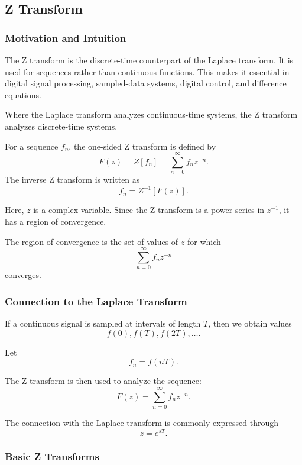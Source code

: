 \subsection{Z Transform}

\subsubsection*{Motivation and Intuition}

The Z transform is the discrete-time counterpart of the Laplace transform. It is used for sequences rather than continuous functions. This makes it essential in digital signal processing, sampled-data systems, digital control, and difference equations.

Where the Laplace transform analyzes continuous-time systems, the Z transform analyzes discrete-time systems.

\begin{conceptbox}
    For a sequence $f_n$, the one-sided Z transform is defined by
    \[
        F(z)=Z[f_n]=\sum_{n=0}^{\infty}f_nz^{-n}.
    \]
    The inverse Z transform is written as
    \[
        f_n=Z^{-1}[F(z)].
    \]
\end{conceptbox}

Here, $z$ is a complex variable. Since the Z transform is a power series in $z^{-1}$, it has a region of convergence.

\begin{conceptbox}
    The region of convergence is the set of values of $z$ for which
    \[
        \sum_{n=0}^{\infty}f_nz^{-n}
    \]
    converges.
\end{conceptbox}

\subsubsection*{Connection to the Laplace Transform}

If a continuous signal is sampled at intervals of length $T$, then we obtain values
\[
    f(0), f(T), f(2T), \ldots.
\]

Let
\[
    f_n=f(nT).
\]

The Z transform is then used to analyze the sequence:
\[
    F(z)=\sum_{n=0}^{\infty}f_nz^{-n}.
\]

The connection with the Laplace transform is commonly expressed through
\[
    z=e^{sT}.
\]

\subsubsection*{Basic Z Transforms}

